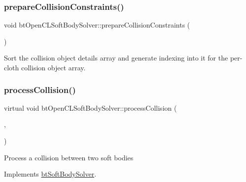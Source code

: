 \subsubsection{\texorpdfstring{prepare\+Collision\+Constraints()}{prepareCollisionConstraints()}}
{\footnotesize\ttfamily void bt\+Open\+C\+L\+Soft\+Body\+Solver\+::prepare\+Collision\+Constraints (\begin{DoxyParamCaption}{ }\end{DoxyParamCaption})\hspace{0.3cm}{\ttfamily [protected]}}

Sort the collision object details array and generate indexing into it for the per-\/cloth collision object array. \mbox{\label{classbtOpenCLSoftBodySolver_abab8bf075930d09ce71458e2cab33c93}} 
\subsubsection{\texorpdfstring{process\+Collision()}{processCollision()}\hspace{0.1cm}{\footnotesize\ttfamily [1/2]}}
{\footnotesize\ttfamily virtual void bt\+Open\+C\+L\+Soft\+Body\+Solver\+::process\+Collision (\begin{DoxyParamCaption}\item[{\hyperlink{classbtSoftBody}{bt\+Soft\+Body} $\ast$}]{,  }\item[{\hyperlink{classbtSoftBody}{bt\+Soft\+Body} $\ast$}]{ }\end{DoxyParamCaption})\hspace{0.3cm}{\ttfamily [virtual]}}

Process a collision between two soft bodies 

Implements \hyperlink{classbtSoftBodySolver_a08f03a574f0936d834ff100f87755ea6}{bt\+Soft\+Body\+Solver}.

\mbox{\label{classbtOpenCLSoftBodySolver_a79c0fb52b0e405fec3ea991e2bf8ec29}} 
